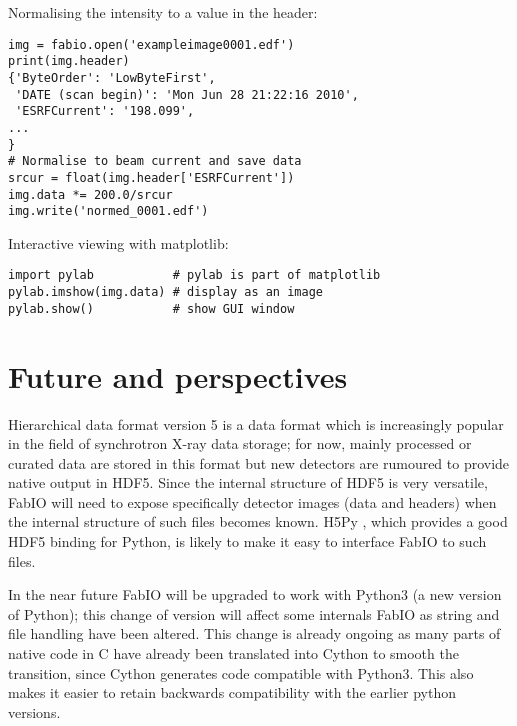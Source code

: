 \documentclass[preprint ]{iucr}
\begin{document}
Normalising the intensity to a value in the header:

\begin{verbatim}
img = fabio.open('exampleimage0001.edf')
print(img.header)
{'ByteOrder': 'LowByteFirst',
 'DATE (scan begin)': 'Mon Jun 28 21:22:16 2010',
 'ESRFCurrent': '198.099',
...
}
# Normalise to beam current and save data
srcur = float(img.header['ESRFCurrent'])
img.data *= 200.0/srcur
img.write('normed_0001.edf')
\end{verbatim}

Interactive viewing with matplotlib:

\begin{verbatim}
import pylab           # pylab is part of matplotlib
pylab.imshow(img.data) # display as an image
pylab.show()           # show GUI window
\end{verbatim}


\section{Future and perspectives}

Hierarchical data format version 5 \cite{hdf5} is a data format which is
increasingly popular in the field of synchrotron X-ray data storage;  
for now, mainly processed or curated data are stored in this format but 
new detectors are rumoured to provide native output in HDF5.
Since the internal structure of HDF5 is very versatile, FabIO will need to expose 
specifically detector images (data and headers) when the internal structure 
of such files becomes known. 
H5Py \cite{h5py}, which provides a good HDF5 binding for Python, is likely to
make it easy to interface FabIO to such files.

In the near future FabIO will be upgraded to work with Python3 (a new version of 
Python); this change of version will affect some internals FabIO as string and 
file handling have been altered.
This change is already ongoing as many parts of native code in C have already
been translated into Cython \cite{cython} to smooth the transition, since 
Cython generates code compatible with Python3. 
This also makes it easier to retain backwards compatibility with the earlier
python versions. %

%
%
\end{document}
